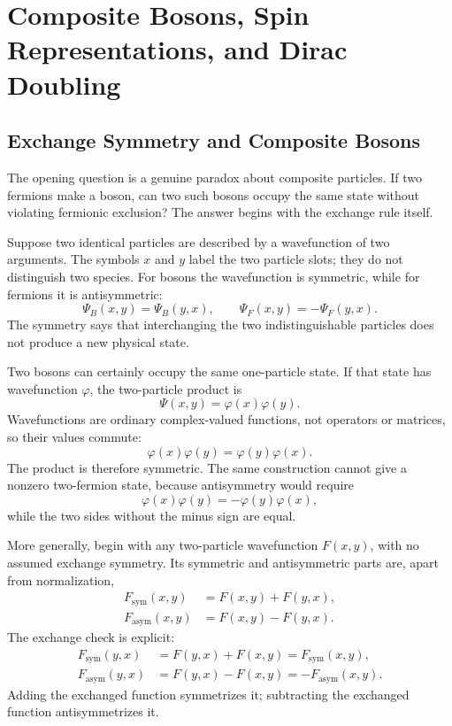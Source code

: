 \chapter{Composite Bosons, Spin Representations, and Dirac Doubling}

\section{Exchange Symmetry and Composite Bosons}

The opening question is a genuine paradox about composite particles. If two fermions make a boson, can two such bosons occupy the same state without violating fermionic exclusion? The answer begins with the exchange rule itself.

Suppose two identical particles are described by a wavefunction of two arguments. The symbols \(x\) and \(y\) label the two particle slots; they do not distinguish two species. For bosons the wavefunction is symmetric, while for fermions it is antisymmetric:
\begin{equation}
\Psi_B(x,y)=\Psi_B(y,x),
\qquad
\Psi_F(x,y)=-\Psi_F(y,x).
\end{equation}
The symmetry says that interchanging the two indistinguishable particles does not produce a new physical state.

Two bosons can certainly occupy the same one-particle state. If that state has wavefunction \(\varphi\), the two-particle product is
\begin{equation}
\Psi(x,y)=\varphi(x)\varphi(y).
\end{equation}
Wavefunctions are ordinary complex-valued functions, not operators or matrices, so their values commute:
\begin{equation}
\varphi(x)\varphi(y)=\varphi(y)\varphi(x).
\end{equation}
The product is therefore symmetric. The same construction cannot give a nonzero two-fermion state, because antisymmetry would require
\begin{equation}
\varphi(x)\varphi(y)=-\varphi(y)\varphi(x),
\end{equation}
while the two sides without the minus sign are equal.

More generally, begin with any two-particle wavefunction \(F(x,y)\), with no assumed exchange symmetry. Its symmetric and antisymmetric parts are, apart from normalization,
\begin{align}
F_{\mathrm{sym}}(x,y)&=F(x,y)+F(y,x),\\
F_{\mathrm{asym}}(x,y)&=F(x,y)-F(y,x).
\end{align}
The exchange check is explicit:
\begin{align}
F_{\mathrm{sym}}(y,x)
&=F(y,x)+F(x,y)
=F_{\mathrm{sym}}(x,y),\\
F_{\mathrm{asym}}(y,x)
&=F(y,x)-F(x,y)
=-F_{\mathrm{asym}}(x,y).
\end{align}
Adding the exchanged function symmetrizes it; subtracting the exchanged function antisymmetrizes it.

